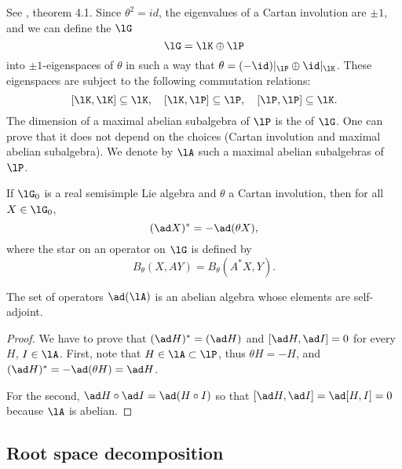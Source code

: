 See \cite{Helgason}, theorem 4.1.  Since $\theta^2=id$, the eigenvalues of a Cartan involution are $\pm 1$, and we can define the  $\lG$
\begin{equation}
                    \lG=\lK\oplus\lP
\end{equation}
into $\pm1$-eigenspaces of $\theta$ in such a way that $\theta=(-\id)|_{\lP}\oplus \id|_{\lK}$. These eigenspaces are subject to the following commutation relations:
\begin{equation} \label{Ieq:comm_KP}
[\lK,\lK]\subseteq\lK,\quad[\lK,\lP]\subseteq\lP,\quad [\lP,\lP]\subseteq\lK.
\end{equation}
%
The dimension of a maximal abelian subalgebra of $\lP$ is the  of $\lG$. One can prove that it does not depend on the choices (Cartan involution and maximal abelian subalgebra). We denote by $\lA$ such a maximal abelian subalgebras of $\lP$.


\begin{lemma}
If $\lG_0$ is a real semisimple Lie algebra and $\theta$ a Cartan involution, then for all $X\in\lG_0$,
\begin{equation}
                (\ad X)^*=-\ad(\theta X),
\end{equation}
where the star on an operator on $\lG$ is defined by
\begin{equation}
                  B_{\theta}(X,AY)=B_{\theta}(A^*X,Y).
\end{equation}
\end{lemma}

\begin{lemma}
The set of operators $\ad(\lA)$ is an abelian algebra whose elements are self-adjoint.
\end{lemma}

\begin{proof}
We have to prove that $(\ad H)^*=(\ad H)$ and $[\ad H,\ad I]=0$ for every $H$, $I\in \lA$.  First, note that $H\in\lA\subset\lP$, thus $\theta H=-H$, and $(\ad H)^*=-\ad(\theta H)=\ad H$.

For the second, $\ad H\circ \ad I=\ad(H\circ I)$ so that $[\ad H,\ad I]=\ad[H,I]=0$ because $\lA$ is abelian.
\end{proof}

\subsection{Root space decomposition}

